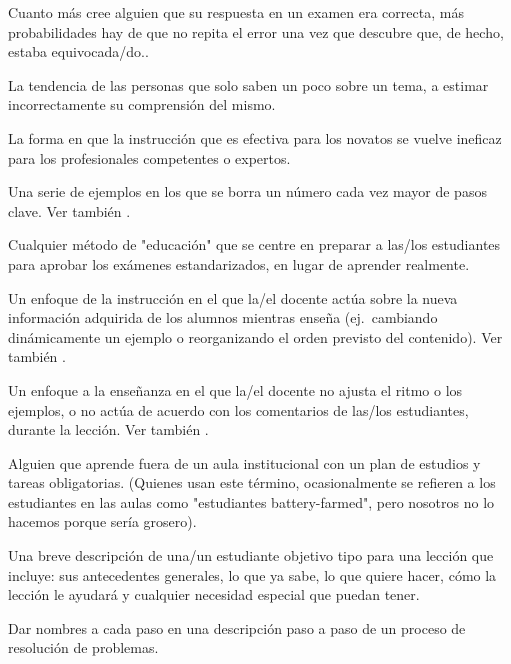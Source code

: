 \begin{description}
 Cuanto más cree alguien
que su respuesta en un examen era correcta, más probabilidades hay de que no
repita el error una vez que descubre que, de hecho, estaba equivocada/do..

 La tendencia de las personas que solo saben un poco sobre un tema, a estimar incorrectamente su comprensión del mismo.

 La forma en que
la instrucción que es efectiva para los novatos se vuelve ineficaz para
los profesionales competentes o expertos.

 Una serie de ejemplos en los que
se borra un número cada vez mayor de pasos clave. Ver
también .

 Cualquier método de "educación"
que se centre en preparar a las/los estudiantes para aprobar los exámenes estandarizados, en lugar de aprender realmente.

 Un enfoque de la instrucción en el que la/el docente
actúa sobre la nueva información adquirida de los alumnos mientras enseña (ej.\ cambiando
dinámicamente un ejemplo o reorganizando el orden previsto del contenido).
Ver también .

 Un enfoque a la enseñanza en el que la/el docente no ajusta el ritmo o los ejemplos, o no actúa de acuerdo con los comentarios de las/los estudiantes, durante la lección.  Ver también .

 Alguien que aprende fuera de un aula institucional con un plan de estudios y tareas obligatorias. (Quienes usan este término, ocasionalmente se refieren a los estudiantes en las aulas como "estudiantes battery-farmed", pero nosotros no lo hacemos porque sería grosero).

 Una breve descripción de una/un estudiante objetivo tipo para una lección que incluye: sus antecedentes generales, lo que ya sabe, lo que quiere hacer, cómo la lección le ayudará y cualquier necesidad especial que puedan tener.

 Dar nombres a cada paso en una descripción paso a paso de un proceso de resolución de problemas.


\end{description}
